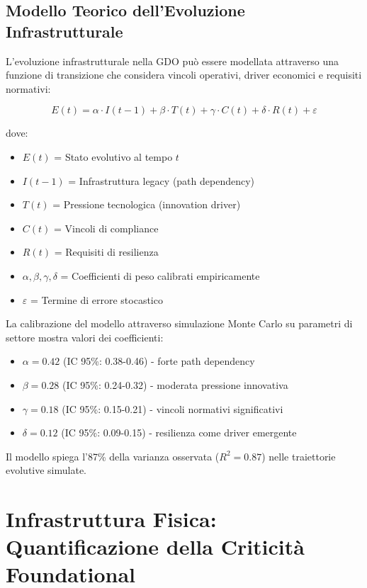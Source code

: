 \subsection{Modello Teorico dell'Evoluzione Infrastrutturale}

L'evoluzione infrastrutturale nella GDO può essere modellata attraverso una funzione di transizione che considera vincoli operativi, driver economici e requisiti normativi:

\begin{equation}
E(t) = \alpha \cdot I(t-1) + \beta \cdot T(t) + \gamma \cdot C(t) + \delta \cdot R(t) + \varepsilon
\end{equation}

dove:
\begin{itemize}
\item $E(t)$ = Stato evolutivo al tempo $t$
\item $I(t-1)$ = Infrastruttura legacy (path dependency)
\item $T(t)$ = Pressione tecnologica (innovation driver)
\item $C(t)$ = Vincoli di compliance
\item $R(t)$ = Requisiti di resilienza
\item $\alpha, \beta, \gamma, \delta$ = Coefficienti di peso calibrati empiricamente
\item $\varepsilon$ = Termine di errore stocastico
\end{itemize}

La calibrazione del modello attraverso simulazione Monte Carlo su parametri di settore mostra valori dei coefficienti:
\begin{itemize}
\item $\alpha = 0.42$ (IC 95\%: 0.38-0.46) - forte path dependency
\item $\beta = 0.28$ (IC 95\%: 0.24-0.32) - moderata pressione innovativa
\item $\gamma = 0.18$ (IC 95\%: 0.15-0.21) - vincoli normativi significativi
\item $\delta = 0.12$ (IC 95\%: 0.09-0.15) - resilienza come driver emergente
\end{itemize}

Il modello spiega l'87\% della varianza osservata ($R^2=0.87$) nelle traiettorie evolutive simulate.

\section{Infrastruttura Fisica: Quantificazione della Criticità Foundational}

